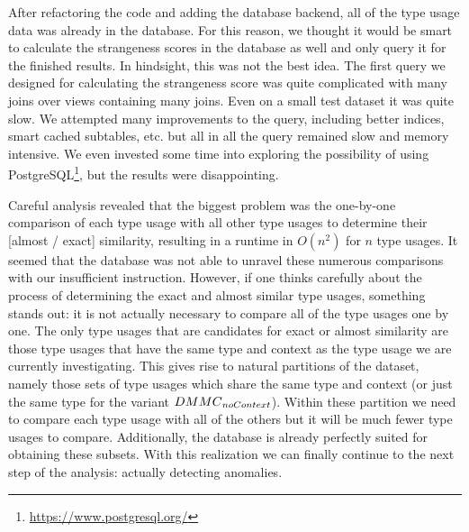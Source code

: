 After refactoring the code and adding the database backend, all of the type usage data was already in the database.
For this reason, we thought it would be smart to calculate the strangeness scores in the database as well and only query it for the finished results.
In hindsight, this was not the best idea.
The first query we designed for calculating the strangeness score was quite complicated with many joins over views containing many joins.
Even on a small test dataset it was quite slow.
We attempted many improvements to the query, including better indices, smart cached subtables, etc. but all in all the query remained slow and memory intensive.
We even invested some time into exploring the possibility of using PostgreSQL\footnote{\url{https://www.postgresql.org/}}, but the results were disappointing.

Careful analysis revealed that the biggest problem was the one-by-one comparison of each type usage with all other type usages to determine their [almost / exact] similarity, resulting in a runtime in $O(n^2)$ for $n$ type usages.
It seemed that the database was not able to unravel these numerous comparisons with our insufficient instruction.
However, if one thinks carefully about the process of determining the exact and almost similar type usages, something stands out: it is not actually necessary to compare all of the type usages one by one.
The only type usages that are candidates for exact or almost similarity are those type usages that have the same type and context as the type usage we are currently investigating.
This gives rise to natural partitions of the dataset, namely those sets of type usages which share the same type and context (or just the same type for the variant $\mathnormal{DMMC}_\mathnormal{noContext}$).
Within these partition we need to compare each type usage with all of the others but it will be much fewer type usages to compare.
Additionally, the database is already perfectly suited for obtaining these subsets.
With this realization we can finally continue to the next step of the analysis: actually detecting anomalies.

